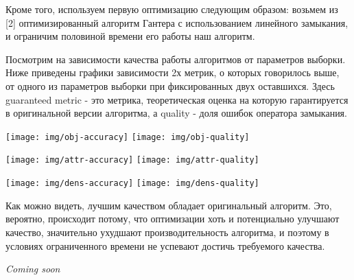 Кроме того, используем первую оптимизацию следующим образом: возьмем из [2] оптимизированный алгоритм Гантера с использованием линейного замыкания, и ограничим половиной времени его работы наш алгоритм.

Посмотрим на зависимости качества работы алгоритмов от параметров выборки. Ниже приведены графики зависимости 2х метрик, о которых говорилось выше, от одного из параметров выборки при фиксированных двух оставшихся. Здесь guaranteed metric - это метрика, теоретическая оценка на которую гарантируется в оригинальной версии алгоритма, а quality - доля ошибок оператора замыкания.

\texttt{[image: img/obj-accuracy]}
\texttt{[image: img/obj-quality]}

\texttt{[image: img/attr-accuracy]}
\texttt{[image: img/attr-quality]}

\texttt{[image: img/dens-accuracy]}
\texttt{[image: img/dens-quality]}

Как можно видеть, лучшим качеством обладает оригинальный алгоритм. Это, вероятно, происходит потому, что оптимизации хоть и потенциально улучшают качество, значительно ухудшают производительность алгоритма, и поэтому в условиях ограниченного времени не успевают достичь требуемого качества.

\emph{Coming soon}
